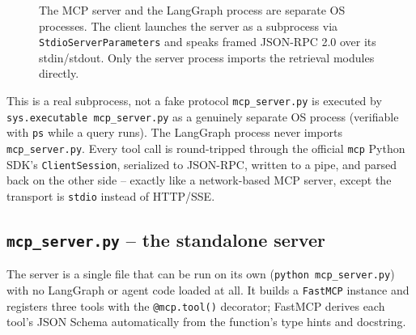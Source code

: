 \documentclass[11pt,a4paper]{article}
\begin{document}
\begin{figure}[H]
\caption{The MCP server and the LangGraph process are separate OS processes. The client launches the server as a subprocess via \texttt{StdioServerParameters} and speaks framed JSON-RPC 2.0 over its stdin/stdout. Only the server process imports the retrieval modules directly.}
\label{fig:mcp}
\end{figure}

\begin{warnbox}{This is a real subprocess, not a fake protocol}
\texttt{mcp\_server.py} is executed by \texttt{sys.executable mcp\_server.py} as
a genuinely separate OS process (verifiable with \texttt{ps} while a query
runs). The LangGraph process never imports \texttt{mcp\_server.py}. Every
tool call is round-tripped through the official \texttt{mcp} Python SDK's
\texttt{ClientSession}, serialized to JSON-RPC, written to a pipe, and
parsed back on the other side -- exactly like a network-based MCP server,
except the transport is \texttt{stdio} instead of HTTP/SSE.
\end{warnbox}

\subsection{\texttt{mcp\_server.py} -- the standalone server}

The server is a single file that can be run on its own
(\texttt{python mcp\_server.py}) with no LangGraph or agent code loaded at
all. It builds a \texttt{FastMCP} instance and registers three tools with
the \texttt{@mcp.tool()} decorator; FastMCP derives each tool's JSON Schema
automatically from the function's type hints and docstring.
\end{document}
